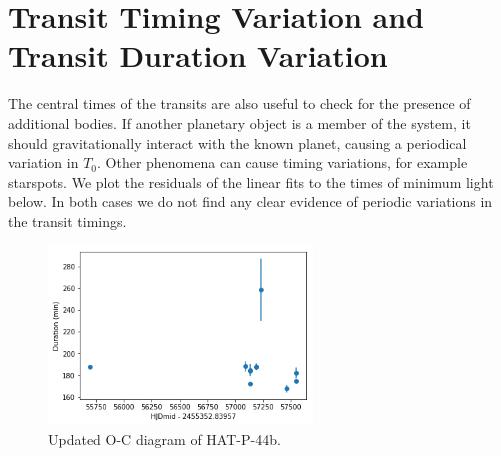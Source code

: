 \section{Transit Timing Variation and Transit Duration Variation}
The central times of the transits are also useful to check for the presence of additional bodies. If another planetary object is a member of the system, it should gravitationally interact with the known planet, causing a periodical variation in $T_0$. Other
phenomena can cause timing variations, for example starspots. %
We plot the residuals of the linear fits to the times of minimum light below. In both cases we do not find any clear evidence of periodic variations in the transit timings.

\begin{figure}
\centering
	\includegraphics[width=7cm]{hatp44/tdv.png}
    \caption{Updated O-C diagram of HAT-P-44b.}
\label{fig:hatp44_tdv}
\end{figure}

